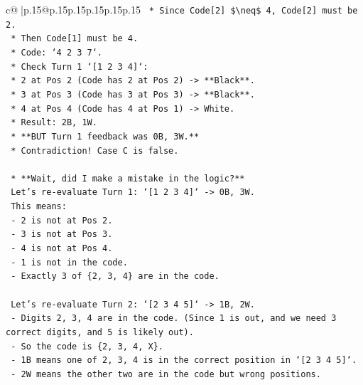 \documentclass{article}
\begin{document}
{\begin{supertabular}{c@{$\;$}|p{.15\linewidth}@{}p{.15\linewidth}p{.15\linewidth}p{.15\linewidth}p{.15\linewidth}p{.15\linewidth}}
{{{\texttt{                *   Since Code{[}2{]} \$\textbackslash{}neq\$ 4, Code{[}2{]} must be 2.} \\
\texttt{                *   Then Code{[}1{]} must be 4.} \\
\texttt{                *   Code: `4 2 3 7`.} \\
\texttt{                *   Check Turn 1 `{[}1 2 3 4{]}`:} \\
\texttt{                    *   2 at Pos 2 (Code has 2 at Pos 2) {-}> **Black**.} \\
\texttt{                    *   3 at Pos 3 (Code has 3 at Pos 3) {-}> **Black**.} \\
\texttt{                    *   4 at Pos 4 (Code has 4 at Pos 1) {-}> White.} \\
\texttt{                    *   Result: 2B, 1W.} \\
\texttt{                    *   **BUT Turn 1 feedback was 0B, 3W.**} \\
\texttt{                    *   Contradiction! Case C is false.} \\
\\ 
\texttt{    *   **Wait, did I make a mistake in the logic?**} \\
\texttt{        Let's re{-}evaluate Turn 1: `{[}1 2 3 4{]}` {-}> 0B, 3W.} \\
\texttt{        This means:} \\
\texttt{        {-} 2 is not at Pos 2.} \\
\texttt{        {-} 3 is not at Pos 3.} \\
\texttt{        {-} 4 is not at Pos 4.} \\
\texttt{        {-} 1 is not in the code.} \\
\texttt{        {-} Exactly 3 of \{2, 3, 4\} are in the code.} \\
\\ 
\texttt{        Let's re{-}evaluate Turn 2: `{[}2 3 4 5{]}` {-}> 1B, 2W.} \\
\texttt{        {-} Digits 2, 3, 4 are in the code. (Since 1 is out, and we need 3 correct digits, and 5 is likely out).} \\
\texttt{        {-} So the code is \{2, 3, 4, X\}.} \\
\texttt{        {-} 1B means one of 2, 3, 4 is in the correct position in `{[}2 3 4 5{]}`.} \\
\texttt{        {-} 2W means the other two are in the code but wrong positions.} \\
\\ 
}}}
\end{supertabular}}
\end{document}
